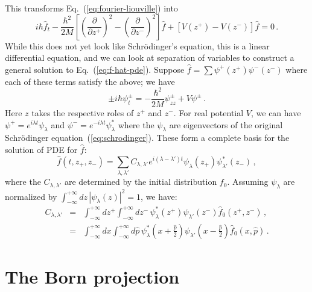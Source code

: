 \documentclass[prb,preprint]{revtex4-1}
\begin{document}
This transforms Eq.~(\ref{eq:fourier-liouville}) into
\begin{equation}\label{eq:f-hat-pde}
i\hbar \hat{f}_t - \frac{\hbar^2}{2M}
\left[\left(\frac{\partial}{\partial z^{+}}\right)^2 - \left(\frac{\partial}{\partial z^{-}}\right)^2\right]\hat{f}
+ [V(z^+) - V(z^-)]\hat{f} = 0 \,.
\end{equation}
While this does not yet look like Schr\"odinger's equation, this is a linear differential
equation, and we can look at separation of variables to construct a general solution
to Eq.~(\ref{eq:f-hat-pde}).
Suppose $\hat{f} = \sum \psi^+(z^+)\psi^-(z^-)$ where each of these terms satisfy the above; we have
\begin{equation}\label{eq:separated}
\pm i\hbar \psi_t^{\pm} = -\frac{\hbar^2}{2M}\psi^{\pm}_{zz} + V\psi^{\pm} \,.
\end{equation}
Here $z$ takes the respective roles of $z^+$ and $z^-$.  For real potential $V$, we can have
$\psi^+ = e^{i\lambda t} \psi_\lambda$ and $\psi^- = e^{-i\lambda t}\psi_\lambda^*$ where the $\psi_\lambda$ are eigenvectors
of the original Schr\"odinger equation~(\ref{eq:schrodinger}).  These form a complete basis for the
solution of PDE for $\hat{f}$:
\begin{equation}\label{eq:f-hat-expansion}
\hat{f}(t,z_+,z_-)=\sum_{\lambda,\lambda'} C_{\lambda,\lambda'} e^{i(\lambda-\lambda')t} \psi_{\lambda}(z_+) \psi^*_{\lambda'}(z_-) \,,
\end{equation}
where the $C_{\lambda,\lambda'}$ are determined by the initial distribution $f_0$.
Assuming $\psi_\lambda$ are normalized by $\int_{-\infty}^{+\infty} dz \, |\psi_\lambda(z)|^2 = 1$, we have:
\begin{eqnarray}
C_{\lambda,\lambda'} &=& \int_{-\infty}^{+\infty} dz^+ \int_{-\infty}^{+\infty} dz^- \, \psi_\lambda^*(z^+) \psi_{\lambda'}(z^-) \hat{f}_0(z^+,z^-) \,, \label{eq:C-z}\\
&=& \int_{-\infty}^{+\infty} dx \int_{-\infty}^{+\infty} d\hat{p} \, \psi_\lambda^*\!\left(x+\frac{\hat{p}}{2}\right) \psi_{\lambda'}\!\left(x-\frac{\hat{p}}{2}\right) \hat{f}_0(x,\hat{p}) \,. \label{eq:C-xp}
\end{eqnarray}


\section{The Born projection}
\end{document}
